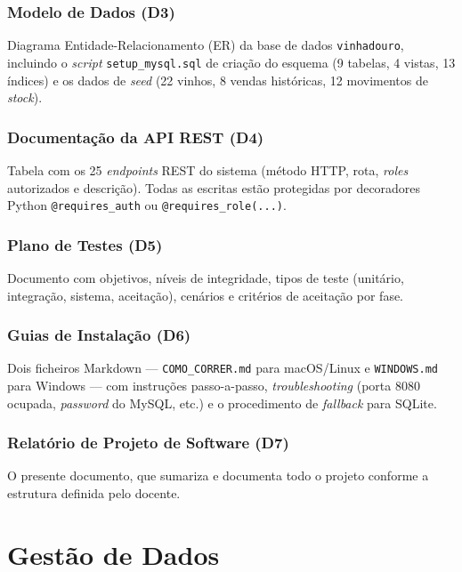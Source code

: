 \documentclass[11pt,a4paper]{report}
\begin{document}
\subsection{Modelo de Dados (D3)}
Diagrama Entidade-Relacionamento (ER) da base de dados \texttt{vinhadouro}, incluindo o \textit{script} \texttt{setup\_mysql.sql} de criação do esquema (9 tabelas, 4 vistas, 13 índices) e os dados de \textit{seed} (22 vinhos, 8 vendas históricas, 12 movimentos de \textit{stock}).

\subsection{Documentação da API REST (D4)}
Tabela com os 25 \textit{endpoints} REST do sistema (método HTTP, rota, \textit{roles} autorizados e descrição). Todas as escritas estão protegidas por decoradores Python \texttt{@requires\_auth} ou \texttt{@requires\_role(...)}.

\subsection{Plano de Testes (D5)}
Documento com objetivos, níveis de integridade, tipos de teste (unitário, integração, sistema, aceitação), cenários e critérios de aceitação por fase.

\subsection{Guias de Instalação (D6)}
Dois ficheiros Markdown --- \texttt{COMO\_CORRER.md} para macOS/Linux e \texttt{WINDOWS.md} para Windows --- com instruções passo-a-passo, \textit{troubleshooting} (porta 8080 ocupada, \textit{password} do MySQL, etc.) e o procedimento de \textit{fallback} para SQLite.

\subsection{Relatório de Projeto de Software (D7)}
O presente documento, que sumariza e documenta todo o projeto conforme a estrutura definida pelo docente.

\chapter{Gestão de Dados}\label{cap:dados}
\end{document}
